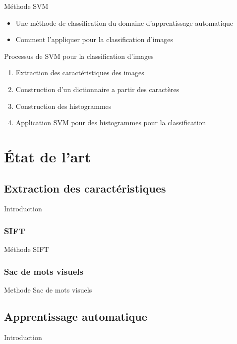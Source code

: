 \documentclass[11pt]{beamer}
\begin{document}
\begin{otherlanguage}{french}
\begin{frame}{Méthode SVM}
\begin{itemize}
\item Une méthode de classification du domaine d'apprentissage automatique
\item Comment l'appliquer pour la classification d'images
\end{itemize}
\end{frame}

\begin{frame}{Processus de SVM pour la classification d'images}
\begin{enumerate}
\item Extraction des caractéristiques des images
\item Construction d'un dictionnaire a partir des caractères
\item Construction des histogrammes
\item Application SVM pour des histogrammes pour la classification
\end{enumerate}
\end{frame}

\section{État de l'art}
\subsection{Extraction des caractéristiques}
\begin{frame}{Introduction}

\end{frame}

\subsubsection{SIFT}
\begin{frame}{Méthode SIFT}

\end{frame}

\subsubsection{Sac de mots visuels}
\begin{frame}{Methode Sac de mots visuels}

\end{frame}

\subsection{Apprentissage automatique}
\begin{frame}{Introduction}


\end{frame}
\end{otherlanguage}
\end{document}
